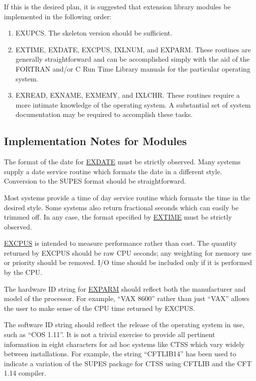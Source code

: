 If this is the desired plan,
it is suggested that extension library modules be implemented in the
following order:
\begin{enumerate}
\item EXUPCS.  The skeleton version should be sufficient.

\item EXTIME, EXDATE, EXCPUS, IXLNUM, and EXPARM.  These routines are
        generally straightforward and can be accomplished simply with the
        aid of the FORTRAN and/or C Run Time Library manuals for the
        particular operating system.

\item EXREAD, EXNAME, EXMEMY, and IXLCHR.  These routines require a more intimate
        knowledge of the operating system.  A substantial set of system
        documentation may be required to accomplish these tasks.
\end{enumerate}

\subsection{Implementation Notes for Modules}
The format of the date for \underline{EXDATE} must be strictly observed.
Many systems supply a date service routine which formats the date in a
different style. Conversion to the SUPES format should be straightforward.

Most systems provide a time of day service routine which formats the time in
the desired style.  Some systems also return fractional seconds which can
easily be trimmed off.  In any case, the format specified by
\underline{EXTIME} must be strictly observed.

\underline{EXCPUS} is intended to measure performance rather than cost.  The
quantity returned by EXCPUS should be raw CPU seconds; any weighting for
memory use or priority should be removed.  I/O time should be included only
if it is performed by the CPU.

The hardware ID string for \underline{EXPARM} should reflect both the
manufacturer and model of the processor.  For example, ``VAX 8600'' rather
than just ``VAX'' allows the user to make sense of the CPU time returned by
EXCPUS.

The software ID string should reflect the release of the operating system in
use, such as ``COS 1.11''.  It is not a trivial exercise to provide all
pertinent information in eight characters for ad hoc systems like CTSS which
vary widely between installations.  For example, the string ``CFTLIB14'' has
been used to indicate a variation of the SUPES package for CTSS using CFTLIB
and the CFT 1.14 compiler.

